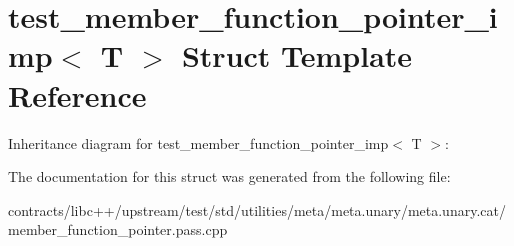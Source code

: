 \hypertarget{structtest__member__function__pointer__imp}{}\section{test\+\_\+member\+\_\+function\+\_\+pointer\+\_\+imp$<$ T $>$ Struct Template Reference}
\label{structtest__member__function__pointer__imp}


Inheritance diagram for test\+\_\+member\+\_\+function\+\_\+pointer\+\_\+imp$<$ T $>$\+:


The documentation for this struct was generated from the following file\+:\begin{DoxyCompactItemize}
\item 
contracts/libc++/upstream/test/std/utilities/meta/meta.\+unary/meta.\+unary.\+cat/member\+\_\+function\+\_\+pointer.\+pass.\+cpp\end{DoxyCompactItemize}
